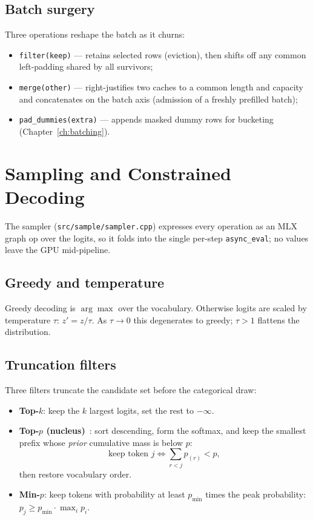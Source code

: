 \documentclass[11pt,a4paper]{report}
\newcommand{\code}[1]{\texttt{#1}}
\begin{document}
\section{Batch surgery}
Three operations reshape the batch as it churns:
\begin{itemize}[nosep]
  \item \code{filter(keep)} --- retains selected rows (eviction), then shifts off
        any common left-padding shared by all survivors;
  \item \code{merge(other)} --- right-justifies two caches to a common length and
        capacity and concatenates on the batch axis (admission of a freshly
        prefilled batch);
  \item \code{pad\_dummies(extra)} --- appends masked dummy rows for bucketing
        (Chapter~\ref{ch:batching}).
\end{itemize}

\chapter{Sampling and Constrained Decoding}
\label{ch:sampling}

The sampler (\code{src/sample/sampler.cpp}) expresses every operation as an MLX
graph op over the logits, so it folds into the single per-step \code{async\_eval};
no values leave the GPU mid-pipeline.

\section{Greedy and temperature}
Greedy decoding is $\arg\max$ over the vocabulary. Otherwise logits are scaled by
temperature $\tau$: $z' = z/\tau$. As $\tau\to 0$ this degenerates to greedy; $\tau>1$
flattens the distribution.

\section{Truncation filters}
Three filters truncate the candidate set before the categorical draw:
\begin{itemize}[nosep]
  \item \textbf{Top-$k$}: keep the $k$ largest logits, set the rest to $-\infty$.
  \item \textbf{Top-$p$ (nucleus)}~\citep{holtzman2020nucleus}: sort descending,
        form the softmax, and keep the smallest prefix whose \emph{prior} cumulative
        mass is below $p$:
        \begin{equation}
          \text{keep token } j \iff \sum_{r < j} p_{(r)} < p,
        \end{equation}
        then restore vocabulary order.
  \item \textbf{Min-$p$}: keep tokens with probability at least $p_{\min}$ times the
        peak probability: $p_j \ge p_{\min}\cdot \max_i p_i$.
\end{itemize}
\end{document}
